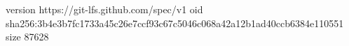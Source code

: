 version https://git-lfs.github.com/spec/v1
oid sha256:3b4e3b7fc1733a45c26e7ccf93c67c5046c068a42a12b1ad40ccb6384e110551
size 87628
